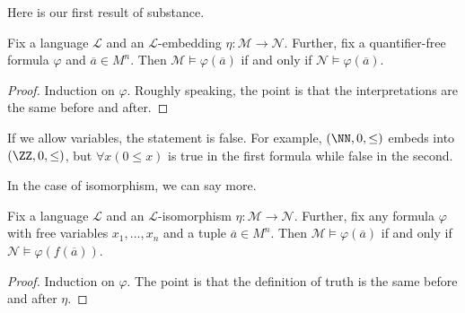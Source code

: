 \documentclass[../notes.tex]{subfiles}
\begin{document}
Here is our first result of substance.
\begin{proposition} \label{prop:substructure-for-qf}
	Fix a language $\mathcal L$ and an $\mathcal L$-embedding $\eta\colon\mathcal M\to\mathcal N$. Further, fix a quantifier-free formula $\varphi$ and $\overline a\in M^n$. Then $\mathcal M\models\varphi(\overline a)$ if and only if $\mathcal N\models\varphi(\overline a)$.
\end{proposition}
\begin{proof}
	Induction on $\varphi$. Roughly speaking, the point is that the interpretations are the same before and after.
\end{proof}
\begin{remark}
	If we allow variables, the statement is false. For example, $(\NN,0,\le)$ embeds into $(\ZZ,0,\le)$, but $\forall x(0\le x)$ is true in the first formula while false in the second.
\end{remark}
In the case of isomorphism, we can say more.
\begin{proposition} \label{prop:isos-have-same-theory}
	Fix a language $\mathcal L$ and an $\mathcal L$-isomorphism $\eta\colon\mathcal M\to\mathcal N$. Further, fix any formula $\varphi$ with free variables $x_1,\ldots,x_n$ and a tuple $\overline a\in M^n$. Then $\mathcal M\models\varphi(\overline a)$ if and only if $\mathcal N\models\varphi(f(\overline a))$.
\end{proposition}
\begin{proof}
	Induction on $\varphi$. The point is that the definition of truth is the same before and after $\eta$.
\end{proof}
\end{document}
